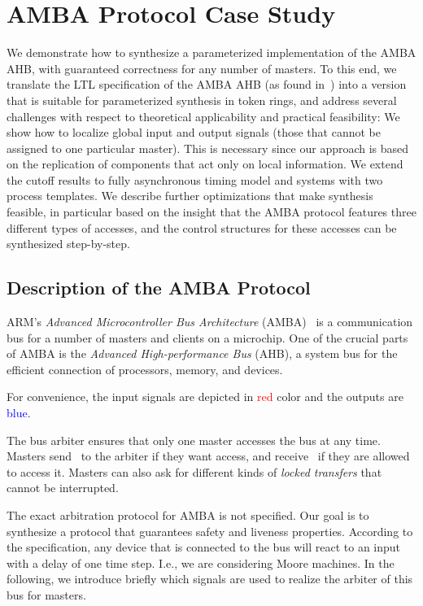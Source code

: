 \section{AMBA Protocol Case Study}\label{amba:sec}

We demonstrate how to synthesize a parameterized implementation of the AMBA AHB,
with guaranteed correctness for any number of masters.
To this end, we translate the LTL specification of the 
AMBA AHB (as found in~\cite{BarbaraThesis}) into a version that is suitable 
for parameterized synthesis in token rings, and address several challenges 
with respect to theoretical applicability and practical feasibility:
\li
\- We show how to localize global input and output signals (those that cannot be assigned to one particular master).
   This is necessary since our approach is based on the replication of components that act only on local information.
\- We extend the cutoff results to fully asynchronous timing model and systems with two process templates.
\- We describe further optimizations that make synthesis feasible,
   in particular based on the insight that the AMBA protocol features three 
   different types of accesses, and the control structures for these accesses 
   can be synthesized step-by-step.
\il

\subsection{Description of the AMBA Protocol} \label{sec:amba}

ARM’s \emph{Advanced Microcontroller Bus Architecture} (AMBA)~\cite{AMBAspec} 
is a communication bus for a number of masters and
clients on a microchip. One of the crucial parts of AMBA is
the \emph{Advanced High-performance Bus} (AHB),
a system bus for the efficient connection of processors, memory, and devices.

For convenience, the input signals are depicted in \textcolor{red}{red} color
and the outputs are \textcolor{blue}{blue}.

The bus arbiter ensures that only one master accesses the bus at any time.
Masters send \hbusreq\ to the arbiter if they want access, and receive
\hgrant\ if they are allowed to access it.
Masters can also ask for different
kinds of \emph{locked transfers} that cannot be interrupted.

The exact arbitration 
protocol for AMBA is not specified. Our goal is to synthesize a protocol 
that guarantees safety and liveness properties. According to the 
specification, any device that is connected to the bus will react to an input 
with a delay of one time step. I.e., we are considering Moore machines. In 
the following, we introduce briefly which signals are used to
realize the arbiter of this bus for masters.

